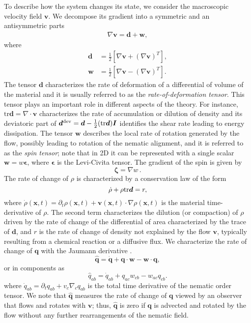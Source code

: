 To describe how the system changes its state, we consider the macroscopic velocity field $\bm{v}$. We decompose its gradient  into a symmetric and an antisymmetric parts
\begin{align} \label{gradv}
	\nabla \bm{v}  = \bm{d} + \bm{w},
\end{align}
where 
\begin{align}
	\label{eq:rate-of-deformation}\bm{d} &= \frac{1}{2}\left[\nabla \bm{v} +\left( \nabla\bm{v}\right)^T\right],\\ 
	\label{eq:spin}\bm{w} &= \frac{1}{2}\left[\nabla \bm{v} -\left( \nabla\bm{v}\right)^T\right].
\end{align}
The tensor $\bm{d}$ characterizes the rate of deformation of a differential of volume of the material and it is usually referred to as the \textit{rate-of-deformation tensor}. This tensor plays an important role in different aspects of the theory. For instance, $\text{tr}\bm{d}=\nabla \cdot \bm{v}$ characterizes the rate of accumulation or dilution of density and its deviatoric part of $\bm{d}^{\rm dev} = \bm{d}  - \frac{1}{2}(\text{tr}\bm{d})\bm{I}$ identifies the shear rate leading to energy dissipation. The tensor $\bm{w}$ describes the local rate of rotation generated by the flow, possibly leading to rotation of the nematic alignment, and it is referred to as the \textit{spin tensor}; note that in 2D it can be represented with a single scalar $\bm{w}=w\bm{\epsilon}$, where $\bm{\epsilon}$ is the Levi-Civita tensor. The gradient of the spin is given by 
\begin{equation} 
	\bm{\zeta} = \nabla w \, .
\end{equation} 
The rate of change of $\rho$ is characterized by a conservation law of the form
\begin{equation}
	\label{eq:balance_mass}
	\dot{\rho} + \rho {\rm tr}\bm{d} = r ,
\end{equation}
where $\dot{\rho}(\bm{x},t) = \partial_t \rho(\bm{x},t) + \bm{v}(\bm{x},t)\cdot\nabla\rho(\bm{x},t)$ is the material time-derivative of $\rho$. The second term characterizes the dilution (or compaction) of $\rho$ driven by the rate of change of the differential of area characterized by the trace of $\bm{d}$, and $r$ is the rate of change of density not explained by the flow $\bm{v}$, typically resulting from a chemical reaction or a diffusive flux.  We characterize the rate of change of $\bm{q}$ with the Jaumann derivative \cite{de1993}.
\begin{equation}
	\label{eq:Jaumann}
	\widehat{\bm{q}}= \dot{\bm{q}}  + \bm{q}  \cdot \bm{w} -  \bm{w}  \cdot \bm{q},
\end{equation}
or in components as
\begin{equation} \label{jaumann_detivative_def}
	\widehat{q}_{ab} = \dot{q}_{ab}  + q_{ac} w_{cb} - w_{ac} q_{cb}.
\end{equation}
where $ \dot{q}_{ab} = \partial_t q_{ab} + v_c \nabla_c q_{ab}$ is the total time derivative of the nematic order tensor.  We note that $\widehat{\bm{q}}$ measures the rate of change of $\bm{q}$ viewed by an observer that flows and rotates with $\bm{v}$; thus, $\widehat{\bm{q}}$ is zero if $\bm{q}$ is advected and rotated by the flow without any further rearrangements of the nematic field. 

